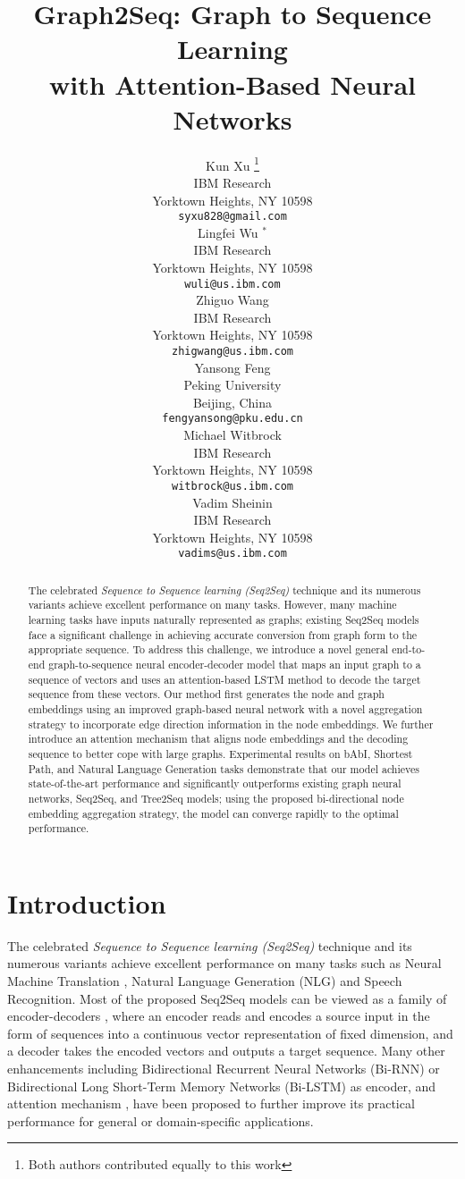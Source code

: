 \documentclass{article} \usepackage{iclr2019_conference,times}
\title{Graph2Seq: Graph to Sequence Learning \\ with Attention-Based Neural Networks}
\author{
  Kun Xu \thanks{Both authors contributed equally to this work}\\
  IBM Research\\
  Yorktown Heights, NY 10598\\
  \texttt{syxu828@gmail.com} \\
  \And
  Lingfei Wu {\small{$^\ast$}}\\
  IBM Research\\
  Yorktown Heights, NY 10598\\
  \texttt{wuli@us.ibm.com} \\
  \AND
  Zhiguo Wang \\
  IBM Research\\
  Yorktown Heights, NY 10598\\
  \texttt{zhigwang@us.ibm.com} \\
  \And
  Yansong Feng  \\
  Peking University\\
  Beijing, China \\
  \texttt{fengyansong@pku.edu.cn} \\
  \AND
  Michael Witbrock\\
  IBM Research\\
  Yorktown Heights, NY 10598\\
  \texttt{witbrock@us.ibm.com} \\
  \And
  Vadim Sheinin \\
  IBM Research\\
  Yorktown Heights, NY 10598\\
  \texttt{vadims@us.ibm.com} \\
}
\begin{document}
\maketitle

\begin{abstract}
The celebrated \emph{Sequence to Sequence learning (Seq2Seq)} technique and its numerous variants achieve excellent performance on many tasks. However, many machine learning tasks have inputs naturally represented as graphs; existing Seq2Seq models face a significant challenge in achieving accurate conversion from graph form to the appropriate sequence. To address this challenge, we introduce a novel general end-to-end graph-to-sequence neural encoder-decoder model that maps an input graph to a sequence of vectors and uses an attention-based LSTM method to decode the target sequence from these vectors. Our method first generates the node and graph embeddings using an improved graph-based neural network with a novel aggregation strategy to incorporate edge direction information in the node embeddings. We further introduce an attention mechanism that aligns node embeddings and the decoding sequence to better cope with large graphs. Experimental results on bAbI, Shortest Path, and Natural Language Generation tasks demonstrate that our model achieves state-of-the-art performance and significantly outperforms existing graph neural networks, Seq2Seq, and Tree2Seq models; using the proposed bi-directional node embedding aggregation strategy, the model can converge rapidly to the optimal performance.
\end{abstract}


\section{Introduction}
The celebrated \emph{Sequence to Sequence learning (Seq2Seq)} technique and its numerous variants achieve excellent performance on many tasks such as Neural Machine Translation \citep{bahdanau2014neural, gehring2017convolutional}, Natural Language Generation (NLG) \citep{DBLP:conf/acl/SongPZWG17} and Speech Recognition\citep{zhang2017very}.
Most of the proposed Seq2Seq models can be viewed as a family of encoder-decoders \citep{DBLP:conf/nips/SutskeverVL14, cho2014learning, bahdanau2014neural}, where an encoder reads and encodes a source input in the form of sequences into a continuous vector representation of fixed dimension, and a decoder takes the encoded vectors and outputs a target sequence. Many other enhancements including Bidirectional Recurrent Neural Networks (Bi-RNN) \citep{schuster1997bidirectional} or Bidirectional Long Short-Term Memory Networks (Bi-LSTM) \citep{graves2005framewise} as encoder, and attention mechanism \citep{bahdanau2014neural,luong2015effective}, have been proposed to further improve its practical performance for general or domain-specific applications.   
\end{document}
